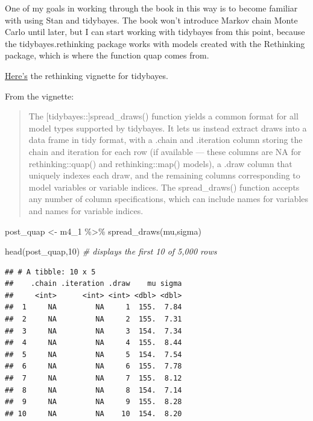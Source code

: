 \documentclass[
]{book}
\newenvironment{Shaded}{\begin{snugshade}}{\end{snugshade}}
\newcommand{\CommentTok}[1]{\textcolor[rgb]{0.56,0.35,0.01}{\textit{#1}}}
\newcommand{\DecValTok}[1]{\textcolor[rgb]{0.00,0.00,0.81}{#1}}
\newcommand{\FunctionTok}[1]{\textcolor[rgb]{0.00,0.00,0.00}{#1}}
\newcommand{\NormalTok}[1]{#1}
\newcommand{\OtherTok}[1]{\textcolor[rgb]{0.56,0.35,0.01}{#1}}
\newcommand{\SpecialCharTok}[1]{\textcolor[rgb]{0.00,0.00,0.00}{#1}}
\begin{document}
One of my goals in working through the book in this way is to become familiar with using Stan and tidybayes. The book won't introduce Markov chain Monte Carlo until later, but I can start working with tidybayes from this point, because the tidybayes.rethinking package works with models created with the Rethinking package, which is where the function quap comes from.

\href{https://mjskay.github.io/tidybayes.rethinking/articles/tidy-rethinking.html}{Here's} the rethinking vignette for tidybayes.

From the vignette:

\begin{quote}
The {[}tidybayes::{]}spread\_draws() function yields a common format for all model types supported by tidybayes. It lets us instead extract draws into a data frame in tidy format, with a .chain and .iteration column storing the chain and iteration for each row (if available --- these columns are NA for rethinking::quap() and rethinking::map() models), a .draw column that uniquely indexes each draw, and the remaining columns corresponding to model variables or variable indices. The spread\_draws() function accepts any number of column specifications, which can include names for variables and names for variable indices.
\end{quote}

\begin{Shaded}
\begin{Highlighting}[]
\NormalTok{post\_quap }\OtherTok{\textless{}{-}}\NormalTok{ m4\_1 }\SpecialCharTok{\%\textgreater{}\%}
  \FunctionTok{spread\_draws}\NormalTok{(mu,sigma)}

\FunctionTok{head}\NormalTok{(post\_quap,}\DecValTok{10}\NormalTok{) }\CommentTok{\# displays the first 10 of 5,000 rows}
\end{Highlighting}
\end{Shaded}

\begin{verbatim}
## # A tibble: 10 x 5
##    .chain .iteration .draw    mu sigma
##     <int>      <int> <int> <dbl> <dbl>
##  1     NA         NA     1  155.  7.84
##  2     NA         NA     2  155.  7.31
##  3     NA         NA     3  154.  7.34
##  4     NA         NA     4  155.  8.44
##  5     NA         NA     5  154.  7.54
##  6     NA         NA     6  155.  7.78
##  7     NA         NA     7  155.  8.12
##  8     NA         NA     8  154.  7.14
##  9     NA         NA     9  155.  8.28
## 10     NA         NA    10  154.  8.20
\end{verbatim}
\end{document}
